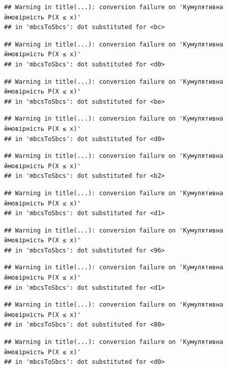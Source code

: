 \documentclass[
  11pt,
]{book}
\begin{document}
\begin{verbatim}
## Warning in title(...): conversion failure on 'Кумулятивна ймовірність P(X ≤ x)'
## in 'mbcsToSbcs': dot substituted for <bc>
\end{verbatim}

\begin{verbatim}
## Warning in title(...): conversion failure on 'Кумулятивна ймовірність P(X ≤ x)'
## in 'mbcsToSbcs': dot substituted for <d0>
\end{verbatim}

\begin{verbatim}
## Warning in title(...): conversion failure on 'Кумулятивна ймовірність P(X ≤ x)'
## in 'mbcsToSbcs': dot substituted for <be>
\end{verbatim}

\begin{verbatim}
## Warning in title(...): conversion failure on 'Кумулятивна ймовірність P(X ≤ x)'
## in 'mbcsToSbcs': dot substituted for <d0>
\end{verbatim}

\begin{verbatim}
## Warning in title(...): conversion failure on 'Кумулятивна ймовірність P(X ≤ x)'
## in 'mbcsToSbcs': dot substituted for <b2>
\end{verbatim}

\begin{verbatim}
## Warning in title(...): conversion failure on 'Кумулятивна ймовірність P(X ≤ x)'
## in 'mbcsToSbcs': dot substituted for <d1>
\end{verbatim}

\begin{verbatim}
## Warning in title(...): conversion failure on 'Кумулятивна ймовірність P(X ≤ x)'
## in 'mbcsToSbcs': dot substituted for <96>
\end{verbatim}

\begin{verbatim}
## Warning in title(...): conversion failure on 'Кумулятивна ймовірність P(X ≤ x)'
## in 'mbcsToSbcs': dot substituted for <d1>
\end{verbatim}

\begin{verbatim}
## Warning in title(...): conversion failure on 'Кумулятивна ймовірність P(X ≤ x)'
## in 'mbcsToSbcs': dot substituted for <80>
\end{verbatim}

\begin{verbatim}
## Warning in title(...): conversion failure on 'Кумулятивна ймовірність P(X ≤ x)'
## in 'mbcsToSbcs': dot substituted for <d0>
\end{verbatim}
\end{document}
